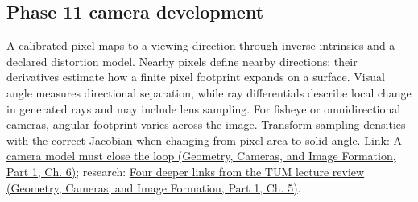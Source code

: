 \subsection{Phase 11 camera development}\label{appendix-7d356c396d1a-phase-11-camera-development}

\hypertarget{appendix-7d356c396d1a-phase-11-camera-development}{}

A calibrated pixel maps to a viewing direction through inverse intrinsics and a declared distortion model. Nearby pixels define nearby directions; their derivatives estimate how a finite pixel footprint expands on a surface. Visual angle measures directional separation, while ray differentials describe local change in generated rays and may include lens sampling. For fisheye or omnidirectional cameras, angular footprint varies across the image. Transform sampling densities with the correct Jacobian when changing from pixel area to solid angle. Link: \href{../03-Geometry-Cameras-and-Image-Formation-P01/main.pdf\#nameddest=02-foundations-ii-ch037-a-camera-model-must-close-the-loop}{A camera model must close the loop (Geometry, Cameras, and Image Formation, Part 1, Ch. 6)}; research: \href{../03-Geometry-Cameras-and-Image-Formation-P01/main.pdf\#nameddest=02-foundations-ii-ch036-four-deeper-links-from-the-tum-lecture-review}{Four deeper links from the TUM lecture review (Geometry, Cameras, and Image Formation, Part 1, Ch. 5)}.
